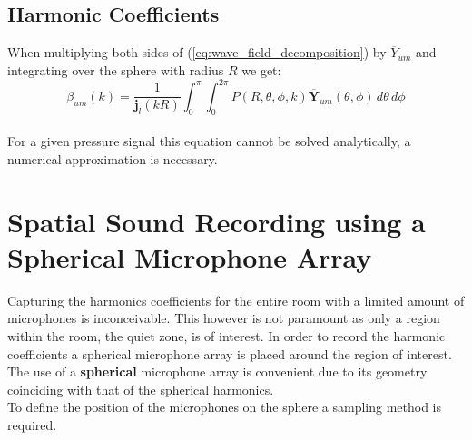 \subsection{Harmonic Coefficients}
When multiplying both sides of (\ref{eq:wave_field_decomposition}) by $\overline Y_{um}$ and integrating over the sphere with radius $R$ we get\cite{Chen2017}:\\
\begin{equation}
    {\beta_{um}(k) = \frac{1}{\mathbf j_l(kR)}\int_0^\pi\int_0^{2\pi}P(R,\theta,\phi,k) \overline {\mathbf{Y}}_{um}(\theta,\phi)\,d\theta\, d\phi}
    \label{eq:harmonic_coefficients}
\end{equation}\\
For a given pressure signal this equation cannot be solved analytically, a numerical approximation is necessary.
\section{Spatial Sound Recording using a Spherical Microphone Array}\label{sec:sampling}
Capturing the harmonics coefficients for the entire room with a limited amount of microphones is inconceivable. This however is not paramount as only a region within the room, the quiet zone, is of interest. In order to record the harmonic coefficients a spherical microphone array is placed around the region of interest. The use of a \textbf{spherical} microphone array is convenient due to its geometry coinciding with that of the spherical harmonics\cite{Chen2017}.\\
To define the position of the microphones on the sphere a sampling method is required.

